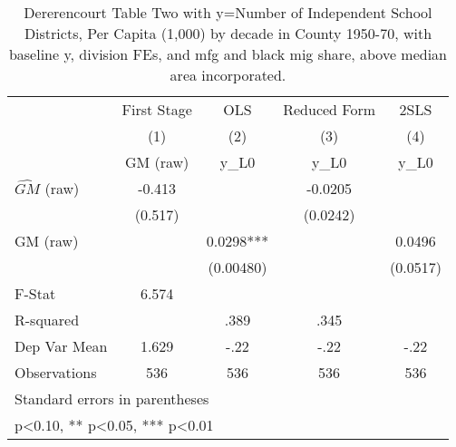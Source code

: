 \begin{table}[htbp]\centering
\def\sym#1{\ifmmode^{#1}\else\(^{#1}\)\fi}
\caption{Dererencourt Table Two with y=Number of Independent School Districts, Per Capita (1,000) by decade in County 1950-70, with baseline y, division FEs, and mfg and black mig share, above median area incorporated.}
\begin{tabular}{l*{4}{c}}
\toprule
                    & First Stage   &         OLS   &Reduced Form   &        2SLS   \\
                    &\multicolumn{1}{c}{(1)}&\multicolumn{1}{c}{(2)}&\multicolumn{1}{c}{(3)}&\multicolumn{1}{c}{(4)}\\
                    &\multicolumn{1}{c}{GM  (raw)}&\multicolumn{1}{c}{y\_L0}&\multicolumn{1}{c}{y\_L0}&\multicolumn{1}{c}{y\_L0}\\
\midrule
$\hat{GM}$ (raw)    &      -0.413   &               &     -0.0205   &               \\
                    &     (0.517)   &               &    (0.0242)   &               \\
\addlinespace
GM  (raw)           &               &      0.0298***&               &      0.0496   \\
                    &               &   (0.00480)   &               &    (0.0517)   \\
\midrule
F-Stat              &       6.574   &               &               &               \\
R-squared           &               &        .389   &        .345   &               \\
Dep Var Mean        &       1.629   &        -.22   &        -.22   &        -.22   \\
Observations        &         536   &         536   &         536   &         536   \\
\bottomrule
\multicolumn{5}{l}{\footnotesize Standard errors in parentheses}\\
\multicolumn{5}{l}{\footnotesize * p<0.10, ** p<0.05, *** p<0.01}\\
\end{tabular}
\end{table}
